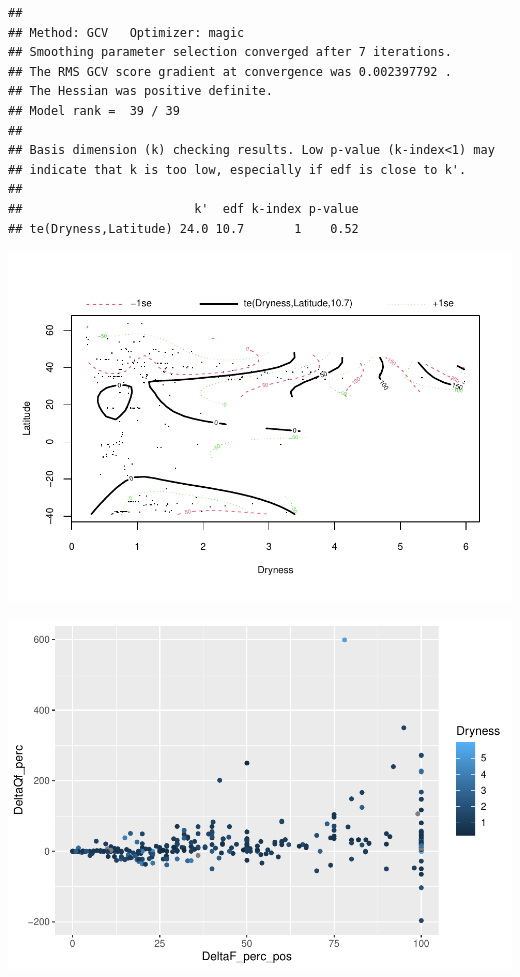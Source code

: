 \documentclass[]{elsarticle} %
\newenvironment{Shaded}{\begin{snugshade}}{\end{snugshade}}
\newcommand{\DataTypeTok}[1]{\textcolor[rgb]{0.13,0.29,0.53}{#1}}
\newcommand{\KeywordTok}[1]{\textcolor[rgb]{0.13,0.29,0.53}{\textbf{#1}}}
\newcommand{\NormalTok}[1]{#1}
\newcommand{\OperatorTok}[1]{\textcolor[rgb]{0.81,0.36,0.00}{\textbf{#1}}}
\newcommand{\StringTok}[1]{\textcolor[rgb]{0.31,0.60,0.02}{#1}}
\begin{document}
\begin{verbatim}
## 
## Method: GCV   Optimizer: magic
## Smoothing parameter selection converged after 7 iterations.
## The RMS GCV score gradient at convergence was 0.002397792 .
## The Hessian was positive definite.
## Model rank =  39 / 39 
## 
## Basis dimension (k) checking results. Low p-value (k-index<1) may
## indicate that k is too low, especially if edf is close to k'.
## 
##                        k'  edf k-index p-value
## te(Dryness,Latitude) 24.0 10.7       1    0.52
\end{verbatim}

\includegraphics{Forest_and_Water_files/figure-latex/model2c-2.pdf}

\begin{Shaded}
\end{Shaded}

\includegraphics{Forest_and_Water_files/figure-latex/unnamed-chunk-14-1.pdf}
\end{document}
